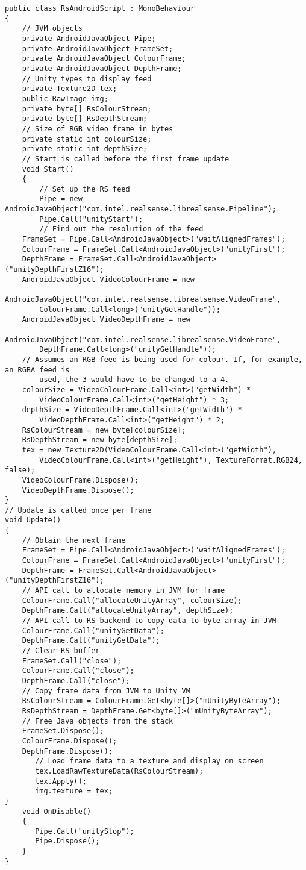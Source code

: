     \begin{lstlisting}[style=CSharpStyle]
public class RsAndroidScript : MonoBehaviour
{
    // JVM objects
    private AndroidJavaObject Pipe;
    private AndroidJavaObject FrameSet;
    private AndroidJavaObject ColourFrame;
    private AndroidJavaObject DepthFrame;
    // Unity types to display feed
    private Texture2D tex;
    public RawImage img;
    private byte[] RsColourStream;
    private byte[] RsDepthStream;
    // Size of RGB video frame in bytes
    private static int colourSize;
    private static int depthSize;
    // Start is called before the first frame update
    void Start()
    {
        // Set up the RS feed
        Pipe = new AndroidJavaObject("com.intel.realsense.librealsense.Pipeline");
        Pipe.Call("unityStart");
        // Find out the resolution of the feed
    FrameSet = Pipe.Call<AndroidJavaObject>("waitAlignedFrames");
    ColourFrame = FrameSet.Call<AndroidJavaObject>("unityFirst");
    DepthFrame = FrameSet.Call<AndroidJavaObject>("unityDepthFirstZ16");
    AndroidJavaObject VideoColourFrame = new
        AndroidJavaObject("com.intel.realsense.librealsense.VideoFrame",
        ColourFrame.Call<long>("unityGetHandle"));
    AndroidJavaObject VideoDepthFrame = new
        AndroidJavaObject("com.intel.realsense.librealsense.VideoFrame",
        DepthFrame.Call<long>("unityGetHandle"));
    // Assumes an RGB feed is being used for colour. If, for example, an RGBA feed is
        used, the 3 would have to be changed to a 4.
    colourSize = VideoColourFrame.Call<int>("getWidth") *
        VideoColourFrame.Call<int>("getHeight") * 3;
    depthSize = VideoDepthFrame.Call<int>("getWidth") *
        VideoDepthFrame.Call<int>("getHeight") * 2;
    RsColourStream = new byte[colourSize];
    RsDepthStream = new byte[depthSize];
    tex = new Texture2D(VideoColourFrame.Call<int>("getWidth"),
        VideoColourFrame.Call<int>("getHeight"), TextureFormat.RGB24, false);
    VideoColourFrame.Dispose();
    VideoDepthFrame.Dispose();
}
// Update is called once per frame
void Update()
{
    // Obtain the next frame
    FrameSet = Pipe.Call<AndroidJavaObject>("waitAlignedFrames");
    ColourFrame = FrameSet.Call<AndroidJavaObject>("unityFirst");
    DepthFrame = FrameSet.Call<AndroidJavaObject>("unityDepthFirstZ16");
    // API call to allocate memory in JVM for frame
    ColourFrame.Call("allocateUnityArray", colourSize);
    DepthFrame.Call("allocateUnityArray", depthSize);
    // API call to RS backend to copy data to byte array in JVM
    ColourFrame.Call("unityGetData");
    DepthFrame.Call("unityGetData");
    // Clear RS buffer
    FrameSet.Call("close");
    ColourFrame.Call("close");
    DepthFrame.Call("close");
    // Copy frame data from JVM to Unity VM
    RsColourStream = ColourFrame.Get<byte[]>("mUnityByteArray");
    RsDepthStream = DepthFrame.Get<byte[]>("mUnityByteArray");
    // Free Java objects from the stack
    FrameSet.Dispose();
    ColourFrame.Dispose();
    DepthFrame.Dispose();
       // Load frame data to a texture and display on screen
       tex.LoadRawTextureData(RsColourStream);
       tex.Apply();
       img.texture = tex;
}
    void OnDisable()
    {
       Pipe.Call("unityStop");
       Pipe.Dispose();
    }
}\end{lstlisting}

